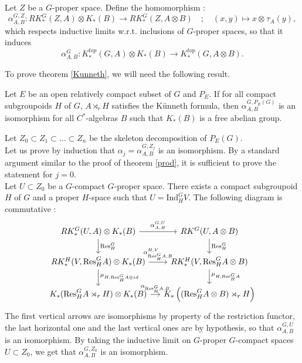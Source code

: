 Let $Z$ be a $G$-proper space. Define the homomorphism :
\[\alpha_{A,B}^{G,Z} : RK^G_*(Z,A)\otimes K_*(B)\rightarrow RK_*^G(Z,A\otimes B) \quad ; \quad (x,y)\mapsto x\otimes_{}   \tau_A(y),\]
which respects inductive limits w.r.t. inclusions of $G$-proper spaces, so that it induces
\[\alpha_{A,B}^G : K_*^{top}(G,A)\otimes K_*(B)\rightarrow K_*^{top}(G,A\otimes B ).\]

To prove theorem \ref{Kunneth}, we will need the following result.

\begin{thm}\label{TopologicalKunneth}
Let $E$ be an open relatively compact subset of $G$ and $P_E$. If for all compact subgroupoids $H$ of $G$, $A\rtimes_r H$ satisfies the Künneth formula, then $\alpha_{A,B}^{G,P_E(G)}$ is an isomorphism for all $C^*$-algebras $B$ such that $K_*(B)$ is a free abelian group.
\end{thm}

\begin{dem}
Let $Z_0\subset Z_1\subset ... \subset Z_n $ be the skeleton decomposition of $P_E(G)$.\\

Let us prove by induction that $\alpha_j=\alpha^{G,Z_j}_{A,B}$ is an isomorphism. By a standard argument similar to the proof of theorem \ref{prod}, it is sufficient to prove the statement for $j=0$.\\

Let $U\subset Z_0$ be a $G$-compact $G$-proper space. There exists a compact subgroupoid $H$ of $G$ and a proper $H$-space such that $U = \text{Ind}_H^G V$. The following diagram is commutative :
\[\begin{tikzcd}[column sep = small] RK_*^G(U,A)\otimes K_*(B) \arrow{r}{\alpha_{A,B}^{G,U}} \arrow{d}{\text{Res}_H^G} & RK^G(U, A\otimes B) \arrow{d}{\text{Res}_H^G}\\
RK_*^H(V, \text{Res}_H^GA)\otimes K_*(B) \arrow{r}{\alpha_{\text{Res}_H^G A,B}^{H,V}} \arrow{d}{\mu_{H,\text{Res}_H^G A \otimes id}} & 
	RK_*^H(V, \text{Res}_H^G A\otimes B)\arrow{d}{\mu_{H,\text{Res}_H^G A }} \\
K_*(\text{Res}_H^G A\rtimes_r H)\otimes K_*(B)\arrow{r}{\alpha_{\text{Res}_H^G A,B}} & K_*\left((\text{Res}_H^G A\otimes B)\rtimes_r H\right) 
\end{tikzcd}\]
The first vertical arrows are isomorphisms by property of the restriction functor, the last horizontal one and the last vertical ones are by hypothesis, so that $\alpha_{A,B}^{G,U}$ is an isomorphism. By taking the inductive limit on $G$-proper $G$-compact spaces $U\subset Z_0$, we get that $\alpha_{A,B}^{G,Z_0}$ is an isomorphism.
\end{dem}

